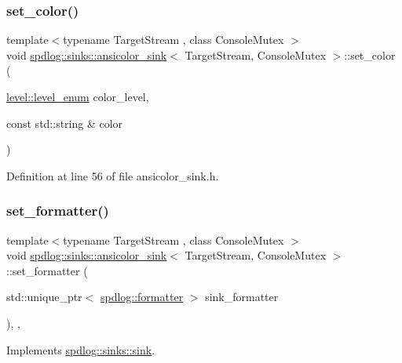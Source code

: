 \subsubsection{\texorpdfstring{set\+\_\+color()}{set\_color()}}
{\footnotesize\ttfamily template$<$typename Target\+Stream , class Console\+Mutex $>$ \\
void \hyperlink{classspdlog_1_1sinks_1_1ansicolor__sink}{spdlog\+::sinks\+::ansicolor\+\_\+sink}$<$ Target\+Stream, Console\+Mutex $>$\+::set\+\_\+color (\begin{DoxyParamCaption}\item[{\hyperlink{namespacespdlog_1_1level_a35f5227e5daf228d28a207b7b2aefc8b}{level\+::level\+\_\+enum}}]{color\+\_\+level,  }\item[{const std\+::string \&}]{color }\end{DoxyParamCaption})\hspace{0.3cm}{\ttfamily [inline]}}



Definition at line 56 of file ansicolor\+\_\+sink.\+h.

\mbox{\label{classspdlog_1_1sinks_1_1ansicolor__sink_a030c3495398d4f320ad444ca940b4731}} 
\subsubsection{\texorpdfstring{set\+\_\+formatter()}{set\_formatter()}}
{\footnotesize\ttfamily template$<$typename Target\+Stream , class Console\+Mutex $>$ \\
void \hyperlink{classspdlog_1_1sinks_1_1ansicolor__sink}{spdlog\+::sinks\+::ansicolor\+\_\+sink}$<$ Target\+Stream, Console\+Mutex $>$\+::set\+\_\+formatter (\begin{DoxyParamCaption}\item[{std\+::unique\+\_\+ptr$<$ \hyperlink{classspdlog_1_1formatter}{spdlog\+::formatter} $>$}]{sink\+\_\+formatter }\end{DoxyParamCaption})\hspace{0.3cm}{\ttfamily [inline]}, {\ttfamily [override]}, {\ttfamily [virtual]}}



Implements \hyperlink{classspdlog_1_1sinks_1_1sink_ac410f2229e583a75337a5fdf45d020be}{spdlog\+::sinks\+::sink}.




